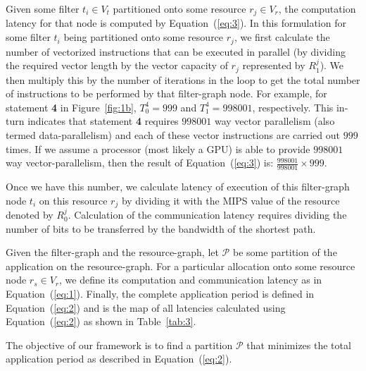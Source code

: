 \documentclass[10pt, conference, compsocconf, reqno]{IEEEtran}
\begin{document}
Given some filter $t_i \in V_t$ partitioned onto some resource $r_j \in V_r$,
the computation latency for that node is computed by Equation~(\ref{eq:3}). In this
formulation for some filter $t_i$ being partitioned onto some resource $r_j$,
we first calculate the number of vectorized instructions that can be
executed in parallel (by dividing the required vector length by the
vector capacity of $r_j$ represented by $R^j_1$). We then multiply this
by the number of iterations in the loop to get the total number of
instructions to be performed by that filter-graph node. For example, for
statement \textbf{4} in Figure~\ref{fig:1b}, $T^4_0=999$ and
$T^4_1=998001$, respectively. This in-turn indicates that statement
\textbf{4} requires $998001$ way vector parallelism (also termed
data-parallelism) and each of these vector instructions are carried out
$999$ times. If we assume a processor (most likely a GPU) is able to
provide $998001$ way vector-parallelism, then the result of
Equation~(\ref{eq:3}) is: $\frac{998001}{998001}\times999$.

Once we have this number, we calculate latency of execution of this
filter-graph node $t_i$ on this resource $r_j$ by dividing it with the
MIPS value of the resource denoted by $R^j_0$. Calculation of the
communication latency requires dividing the number of bits to be transferred by the
bandwidth of the shortest path.

Given the filter-graph and the resource-graph, let $\mathcal{P}$ be some
partition of the application on the resource-graph. For a particular
allocation onto some resource node $r_s \in V_r$, we define its
computation and communication latency as in Equation~(\ref{eq:1}).
Finally, the complete application period is defined in Equation~(\ref{eq:2}) and
is the map of all latencies calculated using Equation~(\ref{eq:2}) as shown in Table~\ref{tab:3}.

The objective of our framework is to find a partition $\mathcal{P}$
that minimizes the total application period as described in
Equation~(\ref{eq:2}).
\end{document}
